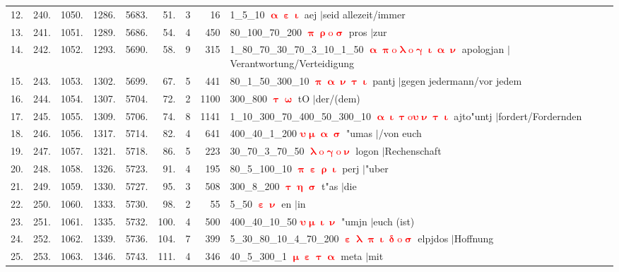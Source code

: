\documentclass[a4paper,10pt,landscape]{article}
\begin{document}
\begin{tabular}{rrrrrrrrp{120mm}}
12.&240.&1050.&1286.&5683.&51.&3&16&1\_5\_10 \textcolor{red}{$\boldsymbol{\upalpha\upepsilon\upiota}$} aej $|$seid allezeit/immer\\
13.&241.&1051.&1289.&5686.&54.&4&450&80\_100\_70\_200 \textcolor{red}{$\boldsymbol{\uppi\uprho\mathrm{o}\upsigma}$} pros $|$zur\\
14.&242.&1052.&1293.&5690.&58.&9&315&1\_80\_70\_30\_70\_3\_10\_1\_50 \textcolor{red}{$\boldsymbol{\upalpha\uppi\mathrm{o}\uplambda\mathrm{o}\upgamma\upiota\upalpha\upnu}$} apologjan $|$Verantwortung/Verteidigung\\
15.&243.&1053.&1302.&5699.&67.&5&441&80\_1\_50\_300\_10 \textcolor{red}{$\boldsymbol{\uppi\upalpha\upnu\uptau\upiota}$} pantj $|$gegen jedermann/vor jedem\\
16.&244.&1054.&1307.&5704.&72.&2&1100&300\_800 \textcolor{red}{$\boldsymbol{\uptau\upomega}$} tO $|$der/(dem)\\
17.&245.&1055.&1309.&5706.&74.&8&1141&1\_10\_300\_70\_400\_50\_300\_10 \textcolor{red}{$\boldsymbol{\upalpha\upiota\uptau\mathrm{o}\upsilon\upnu\uptau\upiota}$} ajto"untj $|$fordert/Fordernden\\
18.&246.&1056.&1317.&5714.&82.&4&641&400\_40\_1\_200 \textcolor{red}{$\boldsymbol{\upsilon\upmu\upalpha\upsigma}$} "umas $|$/von euch\\
19.&247.&1057.&1321.&5718.&86.&5&223&30\_70\_3\_70\_50 \textcolor{red}{$\boldsymbol{\uplambda\mathrm{o}\upgamma\mathrm{o}\upnu}$} logon $|$Rechenschaft\\
20.&248.&1058.&1326.&5723.&91.&4&195&80\_5\_100\_10 \textcolor{red}{$\boldsymbol{\uppi\upepsilon\uprho\upiota}$} perj $|$"uber\\
21.&249.&1059.&1330.&5727.&95.&3&508&300\_8\_200 \textcolor{red}{$\boldsymbol{\uptau\upeta\upsigma}$} t"as $|$die\\
22.&250.&1060.&1333.&5730.&98.&2&55&5\_50 \textcolor{red}{$\boldsymbol{\upepsilon\upnu}$} en $|$in\\
23.&251.&1061.&1335.&5732.&100.&4&500&400\_40\_10\_50 \textcolor{red}{$\boldsymbol{\upsilon\upmu\upiota\upnu}$} "umjn $|$euch (ist)\\
24.&252.&1062.&1339.&5736.&104.&7&399&5\_30\_80\_10\_4\_70\_200 \textcolor{red}{$\boldsymbol{\upepsilon\uplambda\uppi\upiota\updelta\mathrm{o}\upsigma}$} elpjdos $|$Hoffnung\\
25.&253.&1063.&1346.&5743.&111.&4&346&40\_5\_300\_1 \textcolor{red}{$\boldsymbol{\upmu\upepsilon\uptau\upalpha}$} meta $|$mit\\
\end{tabular}
\end{document}
